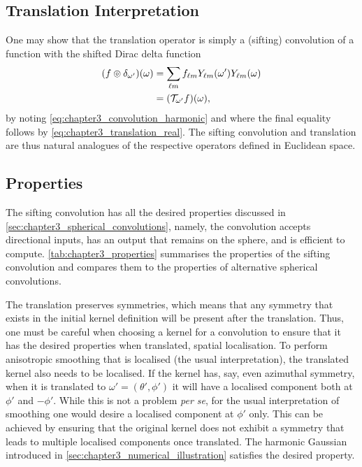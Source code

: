 \subsection{Translation Interpretation}\label{sec:chapter3_translation_interpretation}

One may show that the translation operator is simply a (sifting) convolution of a function with the shifted Dirac delta function
%
\begin{align}
    \pixel{\convolution{f}{\delta_{\omega'}}}
     & = \harmonicSum \harmonic{f} \pixel[']{\harmonic{Y}} \pixel{\harmonic{Y}} \nonumber{} \\
     & = \pixel{(\translation{\omega'}f)},
\end{align}
%
by noting \cref{eq:chapter3_convolution_harmonic} and where the final equality follows by \cref{eq:chapter3_translation_real}.
The sifting convolution and translation are thus natural analogues of the respective operators defined in Euclidean space.

\subsection{Properties}\label{sec:chapter3_properties}

The sifting convolution has all the desired properties discussed in \cref{sec:chapter3_spherical_convolutions}, namely, the convolution accepts directional inputs, has an output that remains on the sphere, and is efficient to compute.
\cref{tab:chapter3_properties} summarises the properties of the sifting convolution and compares them to the properties of alternative spherical convolutions.

The translation preserves symmetries, which means that any symmetry that exists in the initial kernel definition will be present after the translation.
Thus, one must be careful when choosing a kernel for a convolution to ensure that it has the desired properties when translated, \eg{} spatial localisation.
To perform anisotropic smoothing that is localised (the usual interpretation), the translated kernel also needs to be localised.
If the kernel has, say, even azimuthal symmetry, when it is translated to \(\omega'=(\theta', \phi')\) it will have a localised component both at \(\phi'\) and \(-\phi'\).
While this is not a problem \emph{per se}, for the usual interpretation of smoothing one would desire a localised component at \(\phi'\) only.
This can be achieved by ensuring that the original kernel does not exhibit a symmetry that leads to multiple localised components once translated.
The harmonic Gaussian introduced in \cref{sec:chapter3_numerical_illustration} satisfies the desired property.

